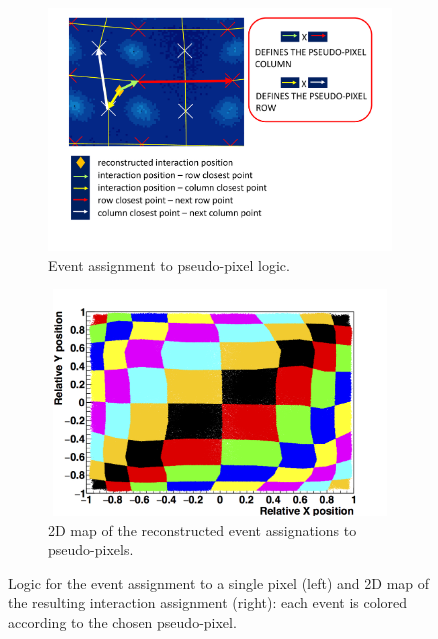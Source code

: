 \begin{figure}
\begin{subfigure}[t]{0.5\textwidth}
\centering
\includegraphics[width=1\textwidth]{03_GraphicFiles/chapter3_CLaRySproto/Absorber/images_charResults_Co60/vector_def.pdf}
\caption{Event assignment to pseudo-pixel logic.}
\label{chap3::fig::absvectors}
\end{subfigure}
\begin{subfigure}[t]{0.5\textwidth}
\centering
\includegraphics[width=1\textwidth, height = 6cm]{03_GraphicFiles/chapter3_CLaRySproto/Absorber/images_charResults_Na22/3_2PixelAssignment.png}
\caption{2D map of the reconstructed event assignations to pseudo-pixels.}
\label{chap3::fig::abspixAssCheck}
\end{subfigure}
\caption{Logic for the event assignment to a single pixel (left) and 2D map of the resulting interaction assignment (right): each event is colored according to the chosen pseudo-pixel. }
\label{chap3::fig::abspixAssignment}
\end{figure}

